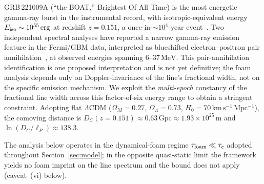 \documentclass[aps,prd,onecolumn,amsmath,amssymb]{revtex4-2}
\begin{document}
GRB\,221009A (``the BOAT,'' Brightest Of All Time) is the most
energetic gamma-ray burst in the instrumental record, with isotropic-equivalent
energy $E_{\rm iso}\sim10^{55}\,\mathrm{erg}$ at redshift $z=0.151$,
a once-in-$\sim10^4$-year event~\cite{Burns2023}.
Two independent spectral analyses have reported a narrow gamma-ray
emission feature in the Fermi/GBM data, interpreted as blueshifted
electron--positron pair annihilation~\cite{Ravasio2024,YQZhang2024}, at
observed energies spanning $6$--$37\,\mathrm{MeV}$.
This pair-annihilation identification is one proposed interpretation
and is not yet definitive; the foam analysis depends only on
Doppler-invariance of the line's fractional width, not on the specific
emission mechanism.
We exploit the \emph{multi-epoch} constancy of the fractional line
width across this factor-of-six energy range to obtain a stringent
constraint.
Adopting flat $\Lambda$CDM
($\Omega_M=0.27$, $\Omega_\Lambda=0.73$,
$H_0=70\,\mathrm{km\,s^{-1}\,Mpc^{-1}}$), the comoving distance is
$D_C(z=0.151)\approx0.63\,\mathrm{Gpc}\approx1.93\times10^{25}\,\mathrm{m}$
and $\ln(D_C/\ell_P)\approx138.3$.

The analysis below operates in the dynamical-foam regime
$\tau_{\rm foam}\ll\tau_c$ adopted throughout
Section~\ref{sec:model}; in the opposite quasi-static limit the
framework yields no foam imprint on the line spectrum and the bound
does not apply (caveat~(vi) below).
\end{document}
